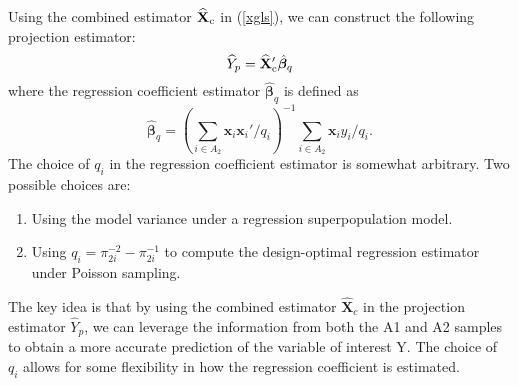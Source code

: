 \documentclass[12pt]{article}
\newcommand{\bx}{\mathbf{x}}
\begin{document}
Using the combined estimator  $\widehat{\mathbf{X}}_{\rm c} $ in (\ref{xgls}), we can construct the following projection estimator:  
\begin{equation}
 \widehat{Y}_p = \widehat{\mathbf{X}}_{\rm c}' \hat{\bm \beta}_q  
 \label{11-proj}
 \end{equation}
where the regression coefficient estimator $\hat{\bm \beta}_q$ is defined as 
$$ 
\hat{\bm \beta}_q = \left( \sum_{i \in A_2} \bx_i \bx_i' / q_i \right)^{-1} 
\sum_{i \in A_2} \bx_i y_i / q_i. 
$$
The choice of $q_i$ in the regression coefficient estimator is somewhat arbitrary. Two possible choices are:
\begin{enumerate}
\item Using the model variance under a regression superpopulation model.
\item Using $q_i = \pi_{2i}^{-2} - \pi_{2i}^{-1}$ to compute the design-optimal regression estimator under Poisson sampling.
\end{enumerate}
The key idea is that by using the combined estimator $\widehat{\mathbf{X}}_c$ in the projection estimator $\widehat{Y}_p$, we can leverage the information from both the A1 and A2 samples to obtain a more accurate prediction of the variable of interest Y. The choice of $q_i$ allows for some flexibility in how the regression coefficient is estimated.
\end{document}
